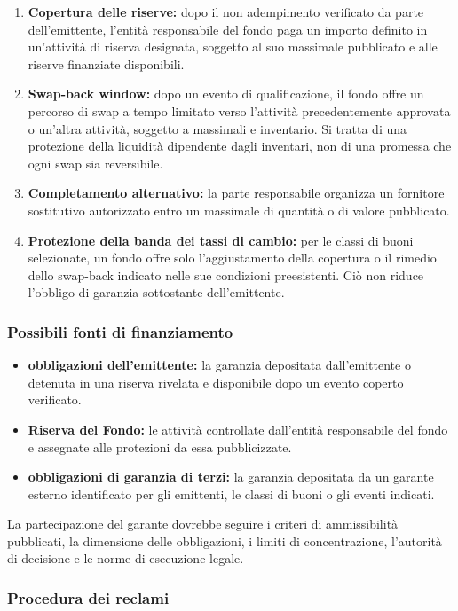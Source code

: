 \documentclass[11pt]{article}
\begin{document}
\begin{enumerate}[leftmargin=*]
\item \textbf{Copertura delle riserve:} dopo il non adempimento verificato da parte dell'emittente, l'entità responsabile del fondo paga un importo definito in un'attività di riserva designata, soggetto al suo massimale pubblicato e alle riserve finanziate disponibili.
\item \textbf{Swap-back window:} dopo un evento di qualificazione, il fondo offre un percorso di swap a tempo limitato verso l'attività precedentemente approvata o un'altra attività, soggetto a massimali e inventario. Si tratta di una protezione della liquidità dipendente dagli inventari, non di una promessa che ogni swap sia reversibile.
\item \textbf{Completamento alternativo:} la parte responsabile organizza un fornitore sostitutivo autorizzato entro un massimale di quantità o di valore pubblicato.
\item \textbf{Protezione della banda dei tassi di cambio:} per le classi di buoni selezionate, un fondo offre solo l'aggiustamento della copertura o il rimedio dello swap-back indicato nelle sue condizioni preesistenti. Ciò non riduce l'obbligo di garanzia sottostante dell'emittente.
\end{enumerate}
\subsubsection*{Possibili fonti di finanziamento}

\begin{itemize}[leftmargin=*]
\item \textbf{obbligazioni dell'emittente:} la garanzia depositata dall'emittente o detenuta in una riserva rivelata e disponibile dopo un evento coperto verificato.
\item \textbf{Riserva del Fondo:} le attività controllate dall'entità responsabile del fondo e assegnate alle protezioni da essa pubblicizzate.
\item \textbf{obbligazioni di garanzia di terzi:} la garanzia depositata da un garante esterno identificato per gli emittenti, le classi di buoni o gli eventi indicati.
\end{itemize}
La partecipazione del garante dovrebbe seguire i criteri di ammissibilità pubblicati, la dimensione delle obbligazioni, i limiti di concentrazione, l'autorità di decisione e le norme di esecuzione legale.

\subsubsection*{Procedura dei reclami}
\end{document}
